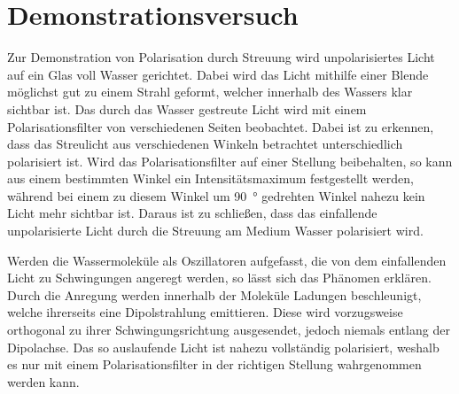 \chapter{Demonstrationsversuch}

Zur Demonstration von Polarisation durch Streuung wird unpolarisiertes Licht auf ein Glas voll Wasser gerichtet.
Dabei wird das Licht mithilfe einer Blende möglichst gut zu einem Strahl geformt, welcher innerhalb des Wassers klar sichtbar ist.
Das durch das Wasser gestreute Licht wird mit einem Polarisationsfilter von verschiedenen Seiten beobachtet.
Dabei ist zu erkennen, dass das Streulicht aus verschiedenen Winkeln betrachtet unterschiedlich polarisiert ist.
Wird das Polarisationsfilter auf einer Stellung beibehalten, so kann aus einem bestimmten Winkel ein Intensitätsmaximum festgestellt werden, während bei einem zu diesem Winkel um \SI{90}{\degree} gedrehten Winkel nahezu kein Licht mehr sichtbar ist.
Daraus ist zu schließen, dass das einfallende unpolarisierte Licht durch die Streuung am Medium Wasser polarisiert wird.\par
Werden die Wassermoleküle als Oszillatoren aufgefasst, die von dem einfallenden Licht zu Schwingungen angeregt werden, so lässt sich das Phänomen erklären.
Durch die Anregung werden innerhalb der Moleküle Ladungen beschleunigt, welche ihrerseits eine Dipolstrahlung emittieren.
Diese wird vorzugsweise orthogonal zu ihrer Schwingungsrichtung ausgesendet, jedoch niemals entlang der Dipolachse.
Das so auslaufende Licht ist nahezu vollständig polarisiert, weshalb es nur mit einem Polarisationsfilter in der richtigen Stellung wahrgenommen werden kann.
